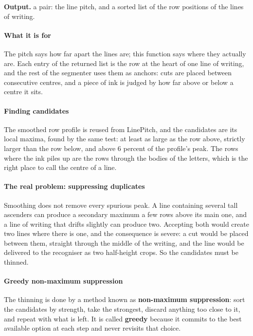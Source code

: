 \noindent\textbf{Output.} a pair: the line pitch, and a sorted list of the row positions of the lines of writing.


\paragraph{What it is for}
The pitch says how far apart the lines are; this function says where they actually are. Each entry of the returned list is the row at the heart of one line of writing, and the rest of the segmenter uses them as anchors: cuts are placed between consecutive centres, and a piece of ink is judged by how far above or below a centre it sits.


\paragraph{Finding candidates}
The smoothed row profile is reused from LinePitch, and the candidates are its local maxima, found by the same test: at least as large as the row above, strictly larger than the row below, and above 6 percent of the profile's peak. The rows where the ink piles up are the rows through the bodies of the letters, which is the right place to call the centre of a line.


\paragraph{The real problem: suppressing duplicates}
Smoothing does not remove every spurious peak. A line containing several tall ascenders can produce a secondary maximum a few rows above its main one, and a line of writing that drifts slightly can produce two. Accepting both would create two lines where there is one, and the consequence is severe: a cut would be placed between them, straight through the middle of the writing, and the line would be delivered to the recogniser as two half-height crops. So the candidates must be thinned.


\paragraph{Greedy non-maximum suppression}
The thinning is done by a method known as \textbf{non-maximum suppression}: sort the candidates by strength, take the strongest, discard anything too close to it, and repeat with what is left. It is called \textbf{greedy} because it commits to the best available option at each step and never revisits that choice.


